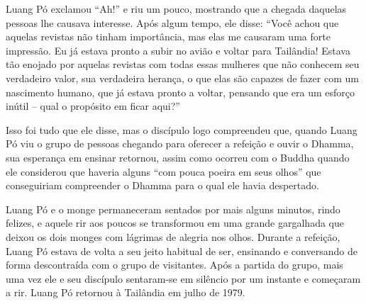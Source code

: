 Luang Pó exclamou ``Ah!'' e riu um pouco, mostrando que a chegada
daquelas pessoas lhe causava interesse. Após algum tempo, ele disse:
``Você achou que aquelas revistas não tinham importância, mas elas me
causaram uma forte impressão. Eu já estava pronto a subir no avião e
voltar para Tailândia! Estava tão enojado por aquelas revistas com todas
essas mulheres que não conhecem seu verdadeiro valor, sua verdadeira
herança, o que elas são capazes de fazer com um nascimento humano, que
já estava pronto a voltar, pensando que era um esforço inútil -- qual o
propósito em ficar aqui?''

Isso foi tudo que ele disse, mas o discípulo logo compreendeu que,
quando Luang Pó viu o grupo de pessoas chegando para oferecer a refeição
e ouvir o Dhamma, sua esperança em ensinar retornou, assim como ocorreu
com o Buddha quando ele considerou que haveria alguns ``com pouca poeira
em seus olhos'' que conseguiriam compreender o Dhamma para o qual ele
havia despertado.

Luang Pó e o monge permaneceram sentados por mais alguns minutos, rindo
felizes, e aquele rir aos poucos se transformou em uma grande gargalhada
que deixou os dois monges com lágrimas de alegria nos olhos. Durante a
refeição, Luang Pó estava de volta a seu jeito habitual de ser,
ensinando e conversando de forma descontraída com o grupo de visitantes.
Após a partida do grupo, mais uma vez ele e seu discípulo sentaram-se em
silêncio por um instante e começaram a rir. Luang Pó retornou à
Tailândia em julho de 1979.

